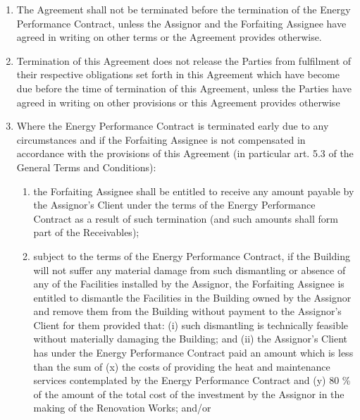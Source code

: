 \documentclass[a4paper]{article}
\begin{document}
\begin{multicols}{2}
\begin{enumerate}
  \item{The Agreement shall not be terminated before the termination
      of the Energy Performance Contract, unless the Assignor and the
      Forfaiting Assignee have agreed in writing on other terms or the
      Agreement provides otherwise.  }

  \item{Termination of this Agreement does not release the Parties
      from fulfilment of their respective obligations set forth in
      this Agreement which have become due before the time of
      termination of this Agreement, unless the Parties have agreed in
      writing on other provisions or this Agreement provides
      otherwise}

  \item{Where the Energy Performance Contract is terminated early due
      to any circumstances and if the Forfaiting Assignee is not
      compensated in accordance with the provisions of this Agreement
      (in particular art. 5.3 of the General Terms and Conditions):}

    \begin{enumerate}
    \item{the Forfaiting Assignee shall be entitled to receive any
        amount payable by the Assignor's Client under the terms of the
        Energy Performance Contract as a result of such termination
        (and such amounts shall form part of the Receivables); }

    \item{subject to the terms of the Energy Performance Contract, if
        the Building will not suffer any material damage from such
        dismantling or absence of any of the Facilities installed by
        the Assignor, the Forfaiting Assignee is entitled to dismantle
        the Facilities in the Building owned by the Assignor and
        remove them from the Building without payment to the
        Assignor’s Client for them provided that: (i) such dismantling
        is technically feasible without materially damaging the
        Building; and (ii) the Assignor's Client has under the Energy
        Performance Contract paid an amount which is less than the sum
        of (x) the costs of providing the heat and maintenance
        services contemplated by the Energy Performance Contract and
        (y) 80 \% of the amount of the total cost of the investment by
        the Assignor in the making of the Renovation Works; and/or}


\end{enumerate}
\end{enumerate}
\end{multicols}
\end{document}
